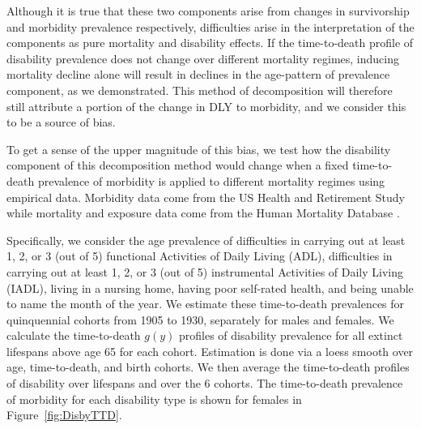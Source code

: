 \documentclass[11pt,oneside,a4paper]{article} %
\begin{document}
Although it is true that these two components arise from changes in survivorship
and morbidity prevalence respectively, difficulties arise in the interpretation
of the components as pure mortality and disability effects. If the time-to-death
profile of disability prevalence does not change over different mortality
regimes, inducing mortality decline alone will result in declines in the
age-pattern of prevalence component, as we demonstrated. This method of
decomposition will therefore still attribute a portion of the
change in DLY to morbidity, and we consider this to be a source of bias.

To get a sense of the upper magnitude of this bias, we test how the disability
component of this decomposition method would change when a fixed time-to-death
prevalence of morbidity is applied to different mortality regimes using empirical data. Morbidity data come from the US Health and Retirement Study while mortality and exposure data come from the Human Mortality Database \citep{HMD2015}.

Specifically, we consider the age prevalence of difficulties in carrying out at
least 1, 2, or 3 (out of 5) functional Activities of Daily Living (ADL),
difficulties in carrying out at least 1, 2, or 3 (out of 5) instrumental
Activities of Daily Living (IADL), living in a nursing home, having poor
self-rated health, and being unable to name the month of the year. We estimate
these time-to-death prevalences for quinquennial cohorts from 1905 to 1930,
separately for males and females. We calculate the time-to-death $g(y)$ profiles of
disability prevalence for all extinct lifespans above age 65 for each cohort.
Estimation is done via a loess smooth over age, time-to-death, and birth
cohorts. We
then average the time-to-death profiles of disability over lifespans and over the 6 cohorts.
 The time-to-death prevalence of morbidity for
each disability type is shown for females in Figure~\ref{fig:DisbyTTD}.
\end{document}
